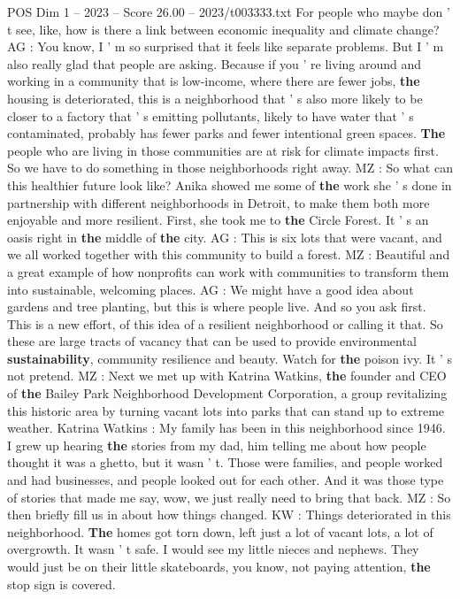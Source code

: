 \begin{textsample}{POS Dim 1 – 2023 – Score 26.00 – 2023/t003333.txt}
For people who maybe don ' t see, like, how is there a link between economic inequality and climate change?
AG : You know, I ' m so surprised that it feels like separate problems.
But I ' m also really glad that people are asking.
Because if you ' re living around and working in a community that is low-income, where there are fewer jobs, \textbf{the} housing is deteriorated, this is a neighborhood that ' s also more likely to be closer to a factory that ' s emitting pollutants, likely to have water that ' s contaminated, probably has fewer parks and fewer intentional green spaces. \textbf{The} people who are living in those communities are at risk for climate impacts first.
So we have to do something in those neighborhoods right away.
MZ : So what can this healthier future look like?
Anika showed me some of \textbf{the} work she ' s done in partnership with different neighborhoods in Detroit, to make them both more enjoyable and more resilient.
First, she took me to \textbf{the} Circle Forest.
It ' s an oasis right in \textbf{the} middle of \textbf{the} city.
AG : This is six lots that were vacant, and we all worked together with this community to build a forest.
MZ : Beautiful and a great example of how nonprofits can work with communities to transform them into sustainable, welcoming places.
AG : We might have a good idea about gardens and tree planting, but this is where people live.
And so you ask first.
This is a new effort, of this idea of a resilient neighborhood or calling it that.
So these are large tracts of vacancy that can be used to provide environmental \textbf{sustainability}, community resilience and beauty.
Watch for \textbf{the} poison ivy.
It ' s not pretend.
MZ : Next we met up with Katrina Watkins, \textbf{the} founder and CEO of \textbf{the} Bailey Park Neighborhood Development Corporation, a group revitalizing this historic area by turning vacant lots into parks that can stand up to extreme weather.
Katrina Watkins : My family has been in this neighborhood since 1946.
I grew up hearing \textbf{the} stories from my dad, him telling me about how people thought it was a ghetto, but it wasn ' t.
Those were families, and people worked and had businesses, and people looked out for each other.
And it was those type of stories that made me say, wow, we just really need to bring that back.
MZ : So then briefly fill us in about how things changed.
KW : Things deteriorated in this neighborhood. \textbf{The} homes got torn down, left just a lot of vacant lots, a lot of overgrowth.
It wasn ' t safe.
I would see my little nieces and nephews.
They would just be on their little skateboards, you know, not paying attention, \textbf{the} stop sign is covered.

\end{textsample}
